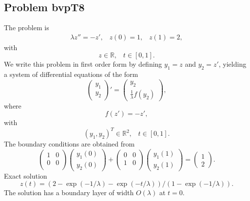 \documentclass[<options>]{article}
\def \RR {{\mathbb{R}}}
\begin{document}
\subsection{Problem bvpT8}\label{test8}
The problem is 
\begin{eqnarray*}
\lambda z'' = -z', \;\;\;z(0) =   1, \;\;\; z(1) = 2,
\end{eqnarray*}
with
\[
z \in \RR, \;\;\; t\in [0,1].
\]
We write this problem in first order form by defining $y_1=z$ and $y_2=z'$, yielding a system of differential equations of the form
\begin{equation*}
\left(\begin{array}{c}
y_1\\
y_2
\end{array}\right)'=
\left(\begin{array}{c}
y_2\\
\frac{1}{\lambda}f(y_2)
\end{array}\right),
\end{equation*}
where
\begin{equation*}
f(z') = -z',
\end{equation*}
with
\[
(y_1,y_2)^T \in \RR^{2}, \;\;\;  t \in [0,1].
\]
The  boundary conditions are obtained from
\begin{equation*}
\left(
  \begin{array}{cc}
    1 & 0 \\
    0 & 0 \\
  \end{array}
\right)
\left(\begin{array}{c}
y_{1}(0)\\
y_{2}(0)
\end{array}\right)
+
\left(
  \begin{array}{cc}
    0 & 0 \\
    1 & 0 \\
  \end{array}
\right)
\left(\begin{array}{c}
y_{1}(1)\\
y_{2}(1)
\end{array}\right)=\left(\begin{array}{c}
1 \\
2
\end{array}\right).
\end{equation*}
\textrm{Exact solution}
$$z(t) =  (2 - \exp(-1/\lambda) - \exp(-t /\lambda)) / (1 - \exp(-1 /\lambda)).$$
The solution has a boundary layer of width $O(\lambda)$  at $t = 0.$
\end{document}

